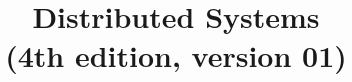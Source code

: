 \newcommand{\lstpath}[1]{}
\newcommand{\setlstpath}[1]{\renewcommand{\lstpath}{#1}}
\newcommand{\includelisting}[1]{}
\newcommand{\oper}[1]{\mbox{$\mathsf{#1}$}}

\newcommand{\lseq}{\mbox{[}}
\newcommand{\rseq}{\mbox{]}}
\newcommand{\sseq}{,\ }


\newcommand{\czero}{}
\newcommand{\ci}{Introduction}
\newcommand{\cii}{Architectures}
\newcommand{\ciii}{Processes}
\newcommand{\civ}{Communication}
\newcommand{\cv}{Coordination}
\newcommand{\cvi}{Naming}
\newcommand{\cvii}{Consistency and Replication}
\newcommand{\cviii}{Fault Tolerance}
\newcommand{\cix}{Security}

\newtheorem{algorithm}{Algorithm}


\title{\textbf{Distributed Systems} \\ {\small (4th edition, version 01)}}
\author{}
\date{}
\institute{}



\graphicspath{{./\figdir\chap/}} %
\setlstpath{./\figdir\chap/}     %

